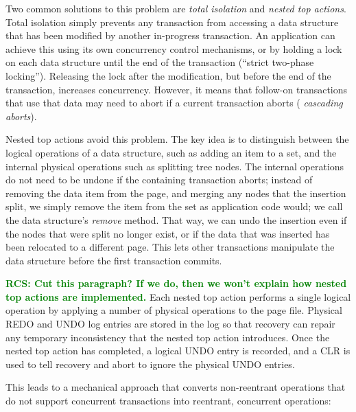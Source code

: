 \documentclass[letterpaper,twocolumn,10pt]{article}
\newcommand{\rcs}[1]{\textcolor{green}{\bf RCS: #1}}
\begin{document}
Two common solutions to this problem are {\em total isolation} and
{\em nested top actions}.  Total isolation simply prevents any
transaction from accessing a data structure that has been modified by
another in-progress transaction.  An application can achieve this
using its own concurrency control mechanisms, or by holding a lock on
each data structure until the end of the transaction (``strict two-phase locking'').  Releasing the
lock after the modification, but before the end of the transaction,
increases concurrency.  However, it means that follow-on transactions that use
that data may need to abort if a current transaction aborts ({\em
cascading aborts}).  %

Nested top actions avoid this problem.  The key idea is to distinguish
between the logical operations of a data structure, such as
adding an item to a set, and the internal physical operations such as
splitting tree nodes. 
The internal operations do not need to be undone if the
containing transaction aborts; instead of removing the data item from
the page, and merging any nodes that the insertion split, we simply
remove the item from the set as application code would; we call the
data structure's {\em remove} method.  That way, we can undo the
insertion even if the nodes that were split no longer exist, or if the
data that was inserted has been relocated to a different page.  This
lets other transactions manipulate the data structure before the first
transaction commits.

\rcs{Cut this paragraph?  If we do, then we won't explain how nested top actions are implemented.} Each nested top action performs a single logical operation by applying
a number of physical operations to the page file.  Physical REDO and
UNDO log entries are stored in the log so that recovery can repair any
temporary inconsistency that the nested top action introduces.  Once
the nested top action has completed, a logical UNDO entry is recorded,
and a CLR is used to tell recovery and abort to ignore the physical
UNDO entries.

This leads to a mechanical approach that converts non-reentrant
operations that do not support concurrent transactions into reentrant,
concurrent operations:
\end{document}
